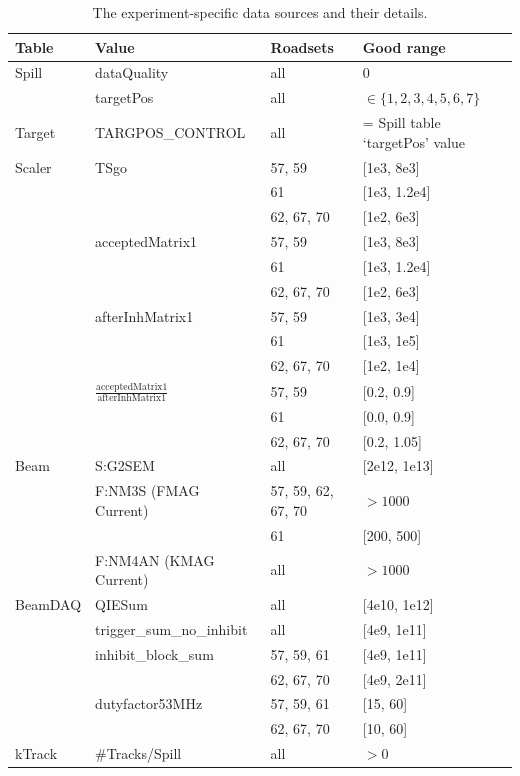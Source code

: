 \begin{table}
	\centering
	\setlength{\tabcolsep}{2em}
	\begin{tabular}{@{}llll@{}} 
\textbf{Table} & \textbf{Value} & \textbf{Roadsets}  & \textbf{Good range} \\ \toprule
Spill & dataQuality & all & 0 \\ \cmidrule(l){2-4}
 & targetPos & all & $\in\{1,2,3,4,5,6,7\}$ \\ \midrule
Target & TARGPOS\_CONTROL & all &  = Spill table `targetPos' value \\ \midrule
Scaler & TSgo & 57, 59 & [1e3, 8e3] \\
	   & & 61 & [1e3, 1.2e4] \\
	   & & 62, 67, 70 & [1e2, 6e3] \\ \cmidrule(l){2-4}
	   & acceptedMatrix1 & 57, 59 & [1e3, 8e3] \\
	   &  & 61 & [1e3, 1.2e4] \\
	   &  & 62, 67, 70 & [1e2, 6e3] \\ \cmidrule(l){2-4}
	   & afterInhMatrix1 & 57, 59 & [1e3, 3e4] \\
	   &  & 61 & [1e3, 1e5] \\
	   &  & 62, 67, 70 & [1e2, 1e4] \\ \cmidrule(l){2-4}
	   & $\frac{\text{acceptedMatrix1}}{\text{afterInhMatrix1}}$ & 57, 59 & [0.2, 0.9] \\
       &  & 61 & [0.0, 0.9] \\
	   &  & 62, 67, 70 & [0.2, 1.05] \\ \midrule
Beam & S:G2SEM & all & [2e12, 1e13] \\ \cmidrule(l){2-4}
	 & F:NM3S (FMAG Current) & 57, 59, 62, 67, 70 & $>1000$ \\ 
 	 & & 61 & [200, 500] \\ \cmidrule(l){2-4}
 	 & F:NM4AN (KMAG Current) & all & $>1000$ \\ \midrule
BeamDAQ & QIESum & all & [4e10, 1e12] \\ \cmidrule(l){2-4}
	    & trigger\_sum\_no\_inhibit & all & [4e9, 1e11] \\ \cmidrule(l){2-4}
	    & inhibit\_block\_sum & 57, 59, 61 & [4e9, 1e11] \\
	    &  & 62, 67, 70 & [4e9, 2e11] \\ \cmidrule(l){2-4}
	    & dutyfactor53MHz & 57, 59, 61 & [15, 60] \\
	    &  & 62, 67, 70 & [10, 60] \\ \midrule
kTrack & \#Tracks/Spill & all & $>0$ \\
\bottomrule
\end{tabular}
\caption{The experiment-specific data sources and their details.}
\label{tab:spill-cuts}
\end{table}

